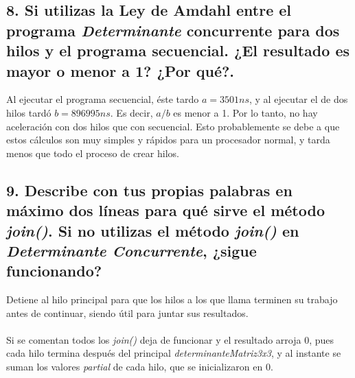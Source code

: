 \documentclass[12pt]{article}
\begin{document}
\subsection*{8. Si utilizas la Ley de Amdahl entre el programa \textit{Determinante} concurrente para dos hilos y el programa secuencial. ¿El resultado es mayor o menor a 1? ¿Por qué?.}


Al ejecutar el programa secuencial, éste tardo $a=3501 ns$, y al ejecutar el de dos hilos tardó $b=896995 ns$. Es decir, $a/b$ es menor a 1. Por lo tanto, no hay aceleración con dos hilos que con secuencial. Esto probablemente se debe a que estos cálculos son muy simples y rápidos para un procesador normal, y tarda menos que todo el proceso de crear hilos.


\subsection*{9. Describe con tus propias palabras en máximo dos líneas para qué sirve el método \textit{join()}. Si no
utilizas el método \textit{join()} en \textit{Determinante Concurrente}, ¿sigue funcionando?}

Detiene al hilo principal para que los hilos a los que llama terminen su trabajo antes de continuar, siendo útil para juntar sus resultados.
\\
\\
Si se comentan todos los \textit{join()} deja de funcionar y el resultado arroja 0, pues cada hilo termina después del principal \textit{determinanteMatriz3x3}, y al instante se suman los valores \textit{partial} de cada hilo, que se inicializaron en 0. 
\\
\end{document}
